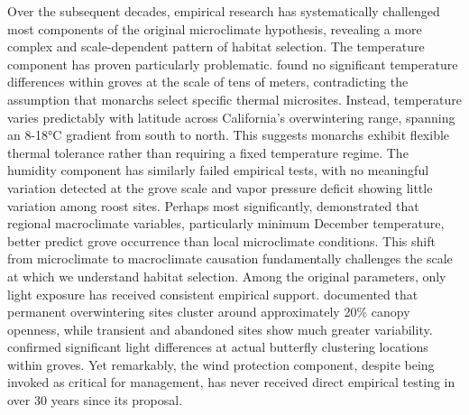 Over the subsequent decades, empirical research has systematically challenged most components of the original microclimate hypothesis, revealing a more complex and scale-dependent pattern of habitat selection. The temperature component has proven particularly problematic. \citet{sanieeHierarchyScaleInfluence2022} found no significant temperature differences within groves at the scale of tens of meters, contradicting the assumption that monarchs select specific thermal microsites. Instead, temperature varies predictably with latitude across California's overwintering range, spanning an 8-18°C gradient from south to north. This suggests monarchs exhibit flexible thermal tolerance rather than requiring a fixed temperature regime. The humidity component has similarly failed empirical tests, with no meaningful variation detected at the grove scale and vapor pressure deficit showing little variation among roost sites. Perhaps most significantly, \citet{fisherClimaticNicheModel2018} demonstrated that regional macroclimate variables, particularly minimum December temperature, better predict grove occurrence than local microclimate conditions. This shift from microclimate to macroclimate causation fundamentally challenges the scale at which we understand habitat selection. Among the original parameters, only light exposure has received consistent empirical support. \citet{weissForestCanopyStructure1991} documented that permanent overwintering sites cluster around approximately 20\% canopy openness, while transient and abandoned sites show much greater variability. \citet{sanieeHierarchyScaleInfluence2022} confirmed significant light differences at actual butterfly clustering locations within groves. Yet remarkably, the wind protection component, despite being invoked as critical for management, has never received direct empirical testing in over 30 years since its proposal.


